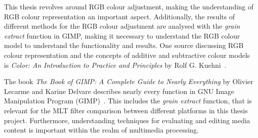 \documentclass[../MasterThesis.tex]{subfiles}
\begin{document}
	
	\begin{description}[font=\color{RedViolet!80!black}, style=nextline]
		
		\item[RGB representation] 
		
		This thesis revolves around RGB colour adjustment, making the understanding of RGB colour representation an important aspect. Additionally, the results of different methods for the RGB colour adjustment are analysed with the \textit{grain extract} function in GIMP, making it necessary to understand the RGB colour model to understand the functionality and results.
		One source discussing RGB colour representation and the concepts of additive and subtractive colour models is \textit{Color: An Introduction to Practice and Principles} by Rolf G. Kuehni~\cite{colourRGB}. 
		
		
		
		
				
		
		\item[GIMP]
		
		
		The book \textit{The Book of GIMP: A Complete Guide to Nearly Everything} by Olivier Lecarme and Karine Delvare describes nearly every function in GNU Image Manipulation Program (GIMP)~\cite{gimp}.
		This includes the \textit{grain extract} function, that is relevant for the MLT filter comparison between different platforms in this thesis project.
		Furthermore, understanding techniques for evaluating and editing media content is important within the realm of multimedia processing.
		
		
		
		
		
		\item[Colour grading] 
		

\end{description}
\end{document}
